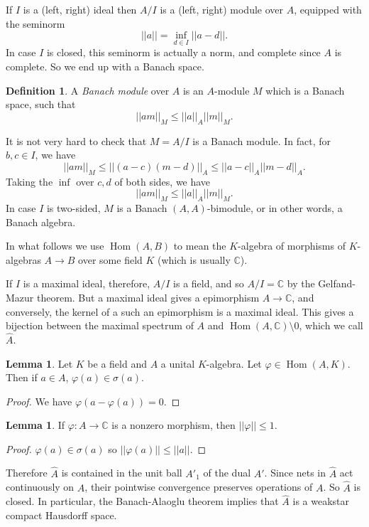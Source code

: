 \documentclass[12pt]{report}
\newcommand{\CC}{\mathbb{C}}
\newcommand{\Hom}{\operatorname{Hom}}
\newcommand{\dfn}[1]{\emph{#1}\index{#1}}
\theoremstyle{definition}
\newtheorem{lemma}[theorem]{Lemma}
\newtheorem{definition}[theorem]{Definition}
\begin{document}
If $I$ is a (left, right) ideal then $A/I$ is a (left, right) module over $A$, equipped with the seminorm
$$||a|| = \inf_{d \in I} ||a - d||.$$
In case $I$ is closed, this seminorm is actually a norm, and complete since $A$ is complete. So we end up with a Banach space.

\begin{definition}
    A \dfn{Banach module} over $A$ is an $A$-module $M$ which is a Banach space, such that
    $$||am||_M \leq ||a||_A ||m||_M.$$
\end{definition}
It is not very hard to check that $M = A/I$ is a Banach module. In fact, for $b, c \in I$, we have
$$||am||_M \leq ||(a - c)(m - d)||_A \leq ||a - c||_A ||m - d||_A.$$
Taking the $\inf$ over $c, d$ of both sides, we have
$$||am||_M \leq ||a||_A ||m||_M.$$
In case $I$ is two-sided, $M$ is a Banach $(A, A)$-bimodule, or in other words, a Banach algebra.

In what follows we use $\Hom(A, B)$ to mean the $K$-algebra of morphisms of $K$-algebras $A \to B$ over some field $K$ (which is usually $\CC$).

If $I$ is a maximal ideal, therefore, $A/I$ is a field, and so $A/I = \CC$ by the Gelfand-Mazur theorem. But a maximal ideal gives a epimorphism $A \to \CC$, and conversely, the kernel of a such an epimorphism is a maximal ideal. This gives a bijection between the maximal spectrum of $A$ and $\Hom(A, \CC) \setminus 0$, which we call $\hat A$.

\begin{lemma}
    Let $K$ be a field and $A$ a unital $K$-algebra. Let $\varphi \in \Hom(A, K)$. Then if $a \in A$, $\varphi(a) \in \sigma(a)$.
\end{lemma}
\begin{proof}
    We have $\varphi(a - \varphi(a)) = 0$.
\end{proof}
\begin{lemma}
    If $\varphi: A \to \CC$ is a nonzero morphism, then $||\varphi|| \leq 1$.
\end{lemma}
\begin{proof}
    $\varphi(a) \in \sigma(a)$ so $||\varphi(a)|| \leq ||a||$.
\end{proof}

Therefore $\hat A$ is contained in the unit ball $A'_1$ of the dual $A'$. Since nets in $\hat A$ act continuously on $A$, their pointwise convergence preserves operations of $A$. So $\hat A$ is closed. In particular, the Banach-Alaoglu theorem implies that $\hat A$ is a weakstar compact Hausdorff space.
\end{document}
